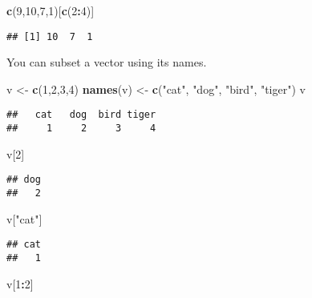 \documentclass[
]{article}
\newenvironment{Shaded}{\begin{snugshade}}{\end{snugshade}}
\newcommand{\DecValTok}[1]{\textcolor[rgb]{0.00,0.00,0.81}{#1}}
\newcommand{\KeywordTok}[1]{\textcolor[rgb]{0.13,0.29,0.53}{\textbf{#1}}}
\newcommand{\NormalTok}[1]{#1}
\newcommand{\OperatorTok}[1]{\textcolor[rgb]{0.81,0.36,0.00}{\textbf{#1}}}
\newcommand{\StringTok}[1]{\textcolor[rgb]{0.31,0.60,0.02}{#1}}
\begin{document}
\begin{Shaded}
\begin{Highlighting}[]
\KeywordTok{c}\NormalTok{(}\DecValTok{9}\NormalTok{,}\DecValTok{10}\NormalTok{,}\DecValTok{7}\NormalTok{,}\DecValTok{1}\NormalTok{)[}\KeywordTok{c}\NormalTok{(}\DecValTok{2}\OperatorTok{:}\DecValTok{4}\NormalTok{)]}
\end{Highlighting}
\end{Shaded}

\begin{verbatim}
## [1] 10  7  1
\end{verbatim}

You can subset a vector using its names.

\begin{Shaded}
\begin{Highlighting}[]
\NormalTok{v <-}\StringTok{ }\KeywordTok{c}\NormalTok{(}\DecValTok{1}\NormalTok{,}\DecValTok{2}\NormalTok{,}\DecValTok{3}\NormalTok{,}\DecValTok{4}\NormalTok{)}
\KeywordTok{names}\NormalTok{(v) <-}\StringTok{ }\KeywordTok{c}\NormalTok{(}\StringTok{"cat"}\NormalTok{, }\StringTok{"dog"}\NormalTok{, }\StringTok{"bird"}\NormalTok{, }\StringTok{"tiger"}\NormalTok{)}
\NormalTok{v}
\end{Highlighting}
\end{Shaded}

\begin{verbatim}
##   cat   dog  bird tiger 
##     1     2     3     4
\end{verbatim}

\begin{Shaded}
\begin{Highlighting}[]
\NormalTok{v[}\DecValTok{2}\NormalTok{]}
\end{Highlighting}
\end{Shaded}

\begin{verbatim}
## dog 
##   2
\end{verbatim}

\begin{Shaded}
\begin{Highlighting}[]
\NormalTok{v[}\StringTok{"cat"}\NormalTok{]}
\end{Highlighting}
\end{Shaded}

\begin{verbatim}
## cat 
##   1
\end{verbatim}

\begin{Shaded}
\begin{Highlighting}[]
\NormalTok{v[}\DecValTok{1}\OperatorTok{:}\DecValTok{2}\NormalTok{]}
\end{Highlighting}
\end{Shaded}
\end{document}
